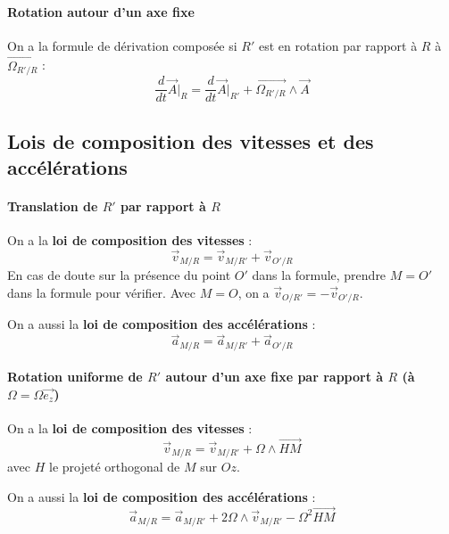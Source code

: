 \documentclass[french]{book}
\theoremstyle{plain}
\theoremstyle{definition}
\theoremstyle{remark}
\begin{document}
\paragraph{Rotation autour d'un axe fixe}On a la formule de dérivation composée si $R'$ est en rotation par rapport à $R$ à $\overrightarrow{\Omega_{R'/R}}$ : $$\frac{d}{dt}\overrightarrow{A}\bigg\rvert_R=\frac{d}{dt}\overrightarrow{A}\bigg\rvert_{R'}+\overrightarrow{\Omega_{R'/R}}\wedge\overrightarrow{A}$$
\subsection{Lois de composition des vitesses et des accélérations}
\paragraph{Translation de $R'$ par rapport à $R$} On a la \textbf{loi de composition des vitesses} : $$\overrightarrow{v}_{M/R}=\overrightarrow{v}_{M/R'}+\overrightarrow{v}_{O'/R}$$En cas de doute sur la présence du point $O'$ dans la formule, prendre $M=O'$ dans la formule pour vérifier. Avec $M=O$, on a $\overrightarrow{v}_{O/R'}=-\overrightarrow{v}_{O'/R}$. \\ \par On a aussi la \textbf{loi de composition des accélérations} : $$\overrightarrow{a}_{M/R}=\overrightarrow{a}_{M/R'}+\overrightarrow{a}_{O'/R}$$
\paragraph{Rotation uniforme de $R'$ autour d'un axe fixe par rapport à $R$ (à $\Omega=\Omega\overrightarrow{e_z}$)} On a la \textbf{loi de composition des vitesses } : $$\overrightarrow{v}_{M/R}=\overrightarrow{v}_{M/R'}+\Omega\wedge\overrightarrow{HM}$$ avec $H$ le projeté orthogonal de $M$ sur $Oz$. \\ \par On a aussi la \textbf{loi de composition des accélérations} : $$\overrightarrow{a}_{M/R}=\overrightarrow{a}_{M/R'}+2\Omega\wedge\overrightarrow{v}_{M/R'}-\Omega^2\overrightarrow{HM}$$
\end{document}
